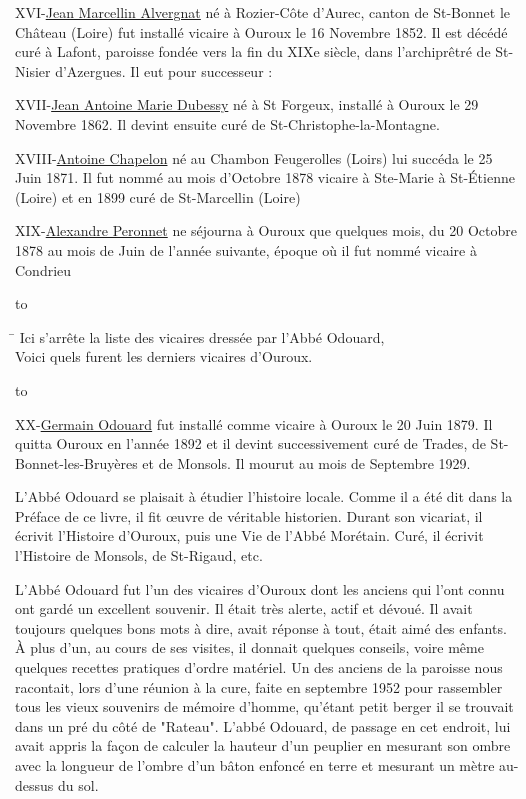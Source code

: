 {\setlength{\emergencystretch}{2em}
XVI-\underline{Jean Marcellin Alvergnat} né à Rozier-Côte d'Aurec, canton de St-Bonnet le Château (Loire) fut installé vicaire à Ouroux le 16 Novembre 1852. Il est décédé curé à Lafont, paroisse fondée vers la fin du XIXe siècle, dans l'archiprêtré de St-Nisier d'Azergues. Il eut pour successeur :\par}

XVII-\underline{Jean Antoine Marie Dubessy} né à St Forgeux, installé à Ouroux le 29 Novembre 1862. Il devint ensuite curé de St-Christophe-la-Montagne.

XVIII-\underline{Antoine Chapelon} né au Chambon Feugerolles (Loirs) lui succéda le 25 Juin 1871. Il fut nommé au mois d'Octobre 1878 vicaire à Ste-Marie à St-Étienne (Loire) et en 1899 curé de St-Marcellin (Loire)

XIX-\underline{Alexandre Peronnet} ne séjourna à Ouroux que quelques mois, du 20 Octobre 1878 au mois de Juin de l'année suivante, époque où il fut nommé vicaire à Condrieu

\noindent\hbox to \par
\begin{tabbing}
\hspace{0.10\textwidth}\=\kill
\>Ici s'arrête la liste des vicaires dressée par l'Abbé Odouard,\\
\>Voici quels furent les derniers vicaires d'Ouroux.
\end{tabbing}
\noindent\hbox to \par

XX-\underline{Germain Odouard} fut installé comme vicaire à Ouroux le 20 Juin 1879. Il quitta Ouroux en l'année 1892 et il devint successivement curé de Trades, de St-Bonnet-les-Bruyères et de Monsols. Il mourut au mois de Septembre 1929.

L'Abbé Odouard se plaisait à étudier l'histoire locale. Comme il a été dit dans la Préface de ce livre, il fit œuvre de véritable historien. Durant son vicariat, il écrivit l'Histoire d'Ouroux, puis une Vie de l'Abbé Morétain. Curé, il écrivit l'Histoire de Monsols, de St-Rigaud, etc.

L'Abbé Odouard fut l'un des vicaires d'Ouroux dont les anciens qui l'ont connu ont gardé un excellent souvenir. Il était très alerte, actif et dévoué. Il avait toujours quelques bons mots à dire, avait réponse à tout, était aimé des enfants. À plus d'un, au cours de ses visites, il donnait quelques conseils, voire même quelques recettes pratiques d'ordre matériel. Un des anciens de la paroisse nous racontait, lors d'une réunion à la cure, faite en septembre 1952 pour rassembler tous les vieux souvenirs de mémoire d'homme, qu'étant petit berger il se trouvait dans un pré du côté de "Rateau". L'abbé Odouard, de passage en cet endroit, lui avait appris la façon de calculer la hauteur d'un peuplier en mesurant son ombre avec la longueur de l'ombre d'un bâton enfoncé en terre et mesurant un mètre au-dessus du sol.

